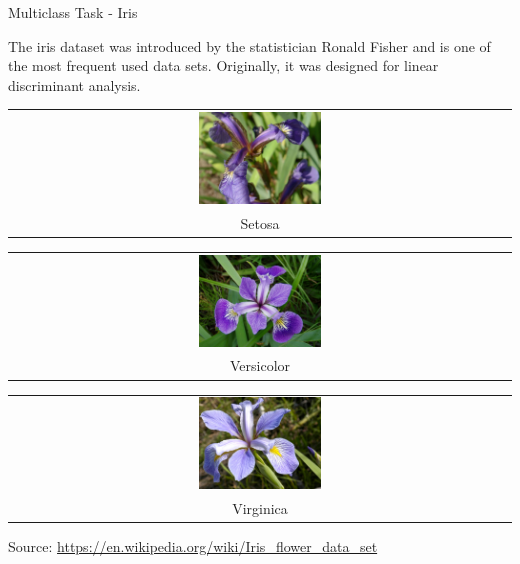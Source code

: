 \documentclass[11pt,compress,t,notes=noshow, xcolor=table]{beamer}
\begin{document}
\begin{vbframe}{Multiclass Task - Iris}

The iris dataset was introduced by the statistician Ronald Fisher and is one
of the most frequent used data sets. Originally, it was designed for linear
discriminant analysis.

\begin{center}
\parbox{0.3\textwidth}{
\centering
  \begin{tabular}{@{}c@{}}
    \includegraphics[width=0.25\textwidth]{figure_man/iris_setosa.jpg} \\[\abovecaptionskip]
    \small Setosa
  \end{tabular}
}
\parbox{0.3\textwidth}{
\centering
  \begin{tabular}{@{}c@{}}
    \includegraphics[width=0.25\textwidth]{figure_man/iris_versicolor.jpg} \\[\abovecaptionskip]
    \small Versicolor
  \end{tabular}
}
\parbox{0.3\textwidth}{
\centering
  \begin{tabular}{@{}c@{}}
    \includegraphics[width=0.25\textwidth]{figure_man/iris_virginica.jpg} \\[\abovecaptionskip]
    \small Virginica
  \end{tabular}
}
\end{center}
  Source: \url{https://en.wikipedia.org/wiki/Iris\_flower\_data\_set}
\end{vbframe}
\end{document}
